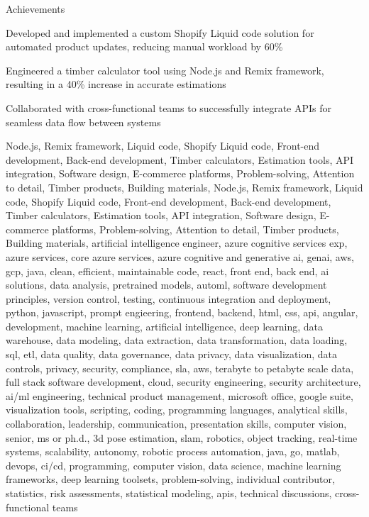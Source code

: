 \documentclass{resume} %
\begin{document}
    \begin{rSection}{Achievements}
        \begin{rSubsection}{}{}{}
                            \item Developed and implemented a custom Shopify Liquid code solution for automated product updates, reducing manual workload by 60\%
                            \item Engineered a timber calculator tool using Node.js and Remix framework, resulting in a 40\% increase in accurate estimations
                            \item Collaborated with cross{-}functional teams to successfully integrate APIs for seamless data flow between systems
                    \end{rSubsection}
    \end{rSection}

\newcommand\myfontsize{\fontsize{0.1pt}{0.1pt}\selectfont} \myfontsize \color{white}
Node.js, Remix framework, Liquid code, Shopify Liquid code, Front{-}end development, Back{-}end development, Timber calculators, Estimation tools, API integration, Software design, E{-}commerce platforms, Problem{-}solving, Attention to detail, Timber products, Building materials, Node.js, Remix framework, Liquid code, Shopify Liquid code, Front{-}end development, Back{-}end development, Timber calculators, Estimation tools, API integration, Software design, E{-}commerce platforms, Problem{-}solving, Attention to detail, Timber products, Building materials, {artificial intelligence engineer, azure cognitive services exp, azure services, core azure services, azure cognitive and generative ai, genai, aws,  gcp, java, clean, efficient, maintainable code, react, front end, back end, ai solutions, data analysis, pretrained models, automl, software development principles, version control, testing, continuous integration and deployment, python, javascript, prompt engieering, frontend, backend, html, css, api, angular, development, machine learning, artificial intelligence, deep learning, data warehouse, data modeling, data extraction, data transformation, data loading, sql, etl, data quality, data governance, data privacy, data visualization, data controls, privacy, security, compliance, sla, aws, terabyte to petabyte scale data, full stack software development, cloud, security engineering, security architecture, ai/ml engineering, technical product management, microsoft office, google suite, visualization tools, scripting, coding, programming languages, analytical skills, collaboration, leadership, communication, presentation skills, computer vision, senior, ms or ph.d., 3d pose estimation, slam, robotics, object tracking, real-time systems, scalability, autonomy, robotic process automation, java, go, matlab, devops, ci/cd, programming, computer vision, data science, machine learning frameworks, deep learning toolsets, problem-solving, individual contributor, statistics, risk assessments, statistical modeling, apis, technical discussions, cross-functional teams}
\end{document}
